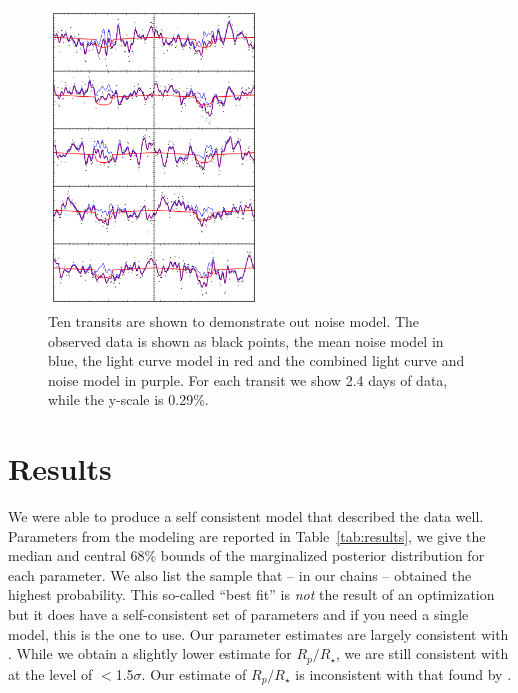 \documentclass[apjl]{emulateapj}
\begin{document}
\begin{figure}
\includegraphics[width=0.50\textwidth]{ten_transits.png}
\caption{Ten transits are shown to demonstrate out noise model. The observed data is shown as black points, the mean noise model in blue, the light curve model in red and the combined light curve and noise model in purple. For each transit we show 2.4 days of data, while the y-scale is 0.29\%.}
\label{fig:filter}
\end{figure}


\section{Results}
We were able to produce a self consistent model that described the data well. Parameters from the modeling are reported in Table~\ref{tab:results}, we give the median and central 68\% bounds of the marginalized posterior distribution for each parameter. We also list the sample that -- in our chains -- obtained the highest probability. This so-called ``best fit'' is \emph{not} the result of an optimization but it does have a self-consistent set of parameters and if you need a single model, this is the one to use. Our parameter estimates are largely consistent with \citet{lillo14}. While we obtain a slightly lower estimate for $R_{p}/R_{\star}$, we are still consistent with \citet{lillo14} at the level of $<$1.5$\sigma$. Our estimate of $R_{p}/R_{\star}$ is inconsistent with that found by \citet{sliski14}.
\end{document}
